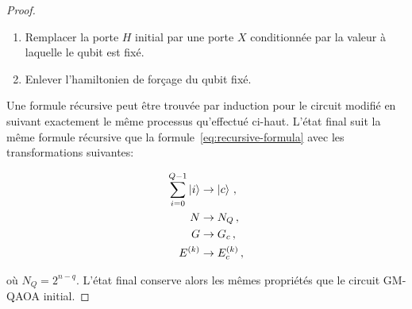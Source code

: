 \begin{proof}
\begin{enumerate}
    \item Remplacer la porte $H$ initial par une porte $X$ conditionnée par la valeur à laquelle le qubit est fixé.
    \item Enlever l'hamiltonien de forçage du qubit fixé.
\end{enumerate}

Une formule récursive peut être trouvée par induction pour le circuit modifié en suivant exactement le même processus qu'effectué ci-haut. L'état final suit la même formule récursive que la formule~\ref{eq:recursive-formula} avec les transformations suivantes:

\begin{equation}    
\begin{aligned}
    \sum_{i=0}^{Q-1} \ket{i} &\to \ket{c} \,, \\
    N &\to N_{Q} \,, \\
    G &\to G_{c} \,, \\
    E^{(k)} &\to E^{(k)}_{c} \,,
\end{aligned}
\end{equation}

où $N_{Q} = 2^{n-q}$. L'état final conserve alors les mêmes propriétés que le circuit GM-QAOA initial.
\end{proof}

